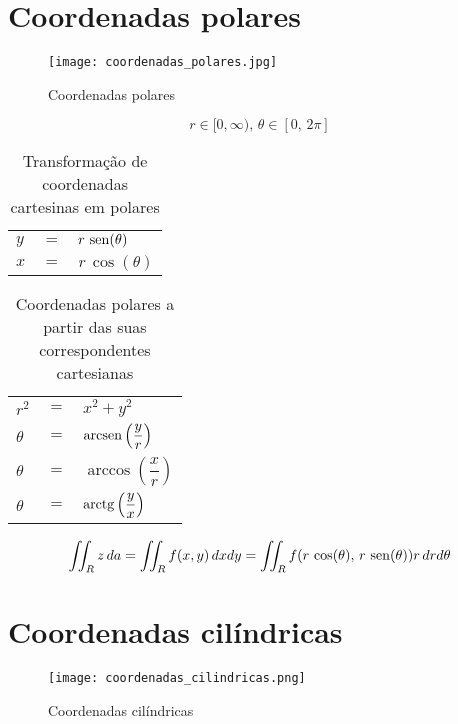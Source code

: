 \section{Coordenadas polares}
	\begin{figure}[H]
		\caption{Coordenadas polares}
		\label{coordenadas_polares}
		\centering
		\texttt{[image: coordenadas\_polares.jpg]}		
	\end{figure}
		
	$$r \in [0, \infty),\, \theta \in [0,\, 2\pi]$$
	
	\begin{table}[H]
		\caption{Transformação de coordenadas cartesinas em polares}
		\label{transformacao_coordenadas_cartesianas_polares}
		\centering		
		\begin{tabular}{|lcl|}
			$y$            & $=$ & $r\,\operatorname{sen}(\theta)$ \\
			$x$            & $=$ & $r\,\cos(\theta)$
		\end{tabular}		
	\end{table}
	\begin{table}[H]
		\caption{Coordenadas polares a partir das suas correspondentes cartesianas}
		\label{correpondentes_coordenadas_cartesianas_polares}
		\centering		
		\begin{tabular}{|lcl|}
			$r^2$    & $=$ & $x^2 + y^2$                        \\
			$\theta$ & $=$ & $\operatorname{arcsen}\left(\dfrac{y}{r}\right)$ \\
			$\theta$ & $=$ & $\arccos\left(\dfrac{x}{r}\right)$ \\
			$\theta$ & $=$ & $\operatorname{arctg}\left(\dfrac{y}{x}\right)$
		\end{tabular}		
	\end{table}
	
	\begin{equation*}
		\iint_R z\, da = \iint_R f(x,y)\, dxdy = \iint_R f(r\,\cos(\theta),\,r\,\operatorname{sen}(\theta)) r\,drd\theta
	\end{equation*}
	
\section{Coordenadas cilíndricas}
	\begin{figure}[H]
		\caption{Coordenadas cilíndricas}
		\label{coordenadas_cilindricas}
		\centering
		\texttt{[image: coordenadas\_cilindricas.png]}		
	\end{figure}
	
